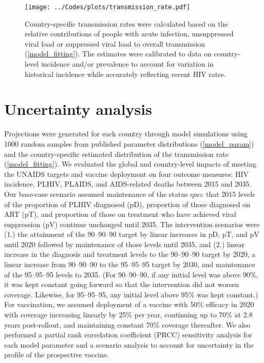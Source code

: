 \documentclass{article}
\begin{document}
\begin{figure}
  \centering
  \texttt{[image: ../Codes/plots/transmission\_rate.pdf]}
  \caption{Country-specific transmission rates were calculated based
    on the relative contributions of people with acute infection,
    unsuppressed viral load or suppressed viral load to overall
    transmission (\autoref{model_fitting}). The estimates were
    calibrated to data on country-level incidence and/or prevalence to
    account for variation in historical incidence while accurately
    reflecting recent HIV rates.}
  \label{transmission_rate}
\end{figure}


\section{Uncertainty analysis}
\label{uncertainty}

Projections were generated for each country through model simulations
using 1000 random samples from published parameter distributions
(\autoref{model_param}) and the country-specific estimated
distribution of the transmission rate (\autoref{model_fitting}). We
evaluated the global and country-level impacts of meeting the UNAIDS
targets and vaccine deployment on four outcome measures: HIV
incidence, PLHIV, PLAIDS, and AIDS-related deaths between 2015 and
2035. Our base-case scenario assumed maintenance of the status quo:
that 2015 levels of the proportion of PLHIV diagnosed (pD), proportion
of those diagnosed on ART (pT), and proportion of those on treatment
who have achieved viral suppression (pV) continue unchanged until
2035. The intervention scenarios were (1.) the attainment of the
90–90–90 target by linear increases in pD, pT, and pV until 2020
followed by maintenance of those levels until 2035, and (2.) linear
increase in the diagnosis and treatment levels to the 90–90–90 target
by 2020, a linear increase from 90–90–90 to the 95–95–95 target by
2030, and maintenance of the 95–95–95 levels to 2035. (For 90–90–90,
if any initial level was above 90\%, it was kept constant going
forward so that the intervention did not worsen coverage.  Likewise,
for 95–95–95, any initial level above 95\% was kept constant.)  For
vaccination, we assumed deployment of a vaccine with 50\% efficacy in
2020 with coverage increasing linearly by 25\% per year, continuing up
to 70\% at 2.8 years post-rollout, and maintaining constant 70\%
coverage thereafter.  We also performed a partial rank correlation
coefficient (PRCC) sensitivity analysis for each model parameter and a
scenario analysis to account for uncertainty in the profile of the
prospective vaccine.
\end{document}
